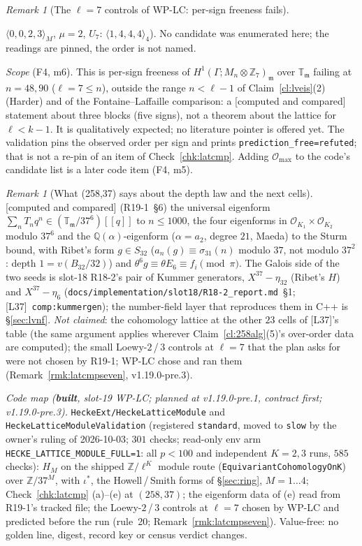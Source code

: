 \documentclass[11pt]{article}
\theoremstyle{remark}
\newtheorem{remark}[theorem]{Remark}
\newcommand{\Z}{\mathbb{Z}}
\newcommand{\Q}{\mathbb{Q}}
\newcommand{\Ga}{\Gamma}
\newcommand{\T}{\mathbb{T}}
\newcommand{\m}{\mathfrak{m}}
\newcommand{\Mn}{M_n}
\newcommand{\CMPD}{\textsf{[computed and compared]}}   %
\begin{document}
\begin{remark}[The $\ell=7$ controls of WP-LC: per-sign freeness fails]
\begin{enumerate}
  $\langle0,0,2,3\rangle_M$, $\mu=2$, $U_7$: $\langle1,4,4,4\rangle_4$). No candidate was enumerated here; the readings are pinned, the order is not named.
\end{enumerate}
\emph{Scope} (F4, m6). This is per-sign freeness of $H^{1}(\Ga;\Mn\otimes\Z_7)_\m$ over $\T_\m$ failing at $n=48,90$ ($\ell=7\le n$), outside the range $n<\ell-1$ of
Claim~\ref{cl:lveis}(2) (Harder) and of the Fontaine--Laffaille comparison: a \CMPD{} statement about three blocks (five signs), not a theorem about the lattice for
$\ell<k-1$. It is qualitatively expected; no literature pointer is offered yet. The validation pins the observed order per sign and prints
\texttt{prediction\_free=refuted}; that is not a re-pin of an item of Check~\ref{chk:latcmp}. Adding $\mathcal O_{\max}$ to the code's candidate list is a later code
item (F4, m5).
\end{remark}

\begin{remark}[What (258,37) says about the depth law and the next cells]\label{rmk:258next}
\CMPD{} (R19-1~\S6) the universal eigenform $\sum_nT_nq^{n}\in(\T_\m/37^{6})[[q]]$ to $n\le1000$, the four eigenforms in $\mathcal O_{K_1}\times\mathcal O_{K_2}$ modulo
$37^{6}$ and the $\Q(\alpha)$-eigenform ($\alpha=a_2$, degree $21$, Maeda) to the Sturm bound, with Ribet's form $g\in S_{32}$ ($a_n(g)\equiv\sigma_{31}(n)$ modulo $37$, not
modulo $37^{2}$: depth $1=v(B_{32}/32)$) and $\theta^{6}g\equiv\theta E_6\equiv f_i\pmod\pi$. The Galois side of the two seeds is slot-18 R18-2's pair of Kummer
generators, $X^{37}-\eta_{32}$ (Ribet's $H$) and $X^{37}-\eta_6$ (\texttt{docs/implementation/slot18/R18-2\_report.md}~\S1; [L37]~\texttt{comp:kummergen}); the
number-field layer that reproduces them in C++ is \S\ref{sec:lvnf}. \emph{Not claimed}: the cohomology lattice at the other $23$ cells of [L37]'s table
(the same argument applies wherever Claim~\ref{cl:258alg}(5)'s over-order data are computed); the small Loewy-$2$\,/\,$3$ controls at $\ell=7$ that the plan asks
for were not chosen by R19-1; WP-LC chose and ran them (Remark~\ref{rmk:latcmpseven}, v1.19.0-pre.3).
\end{remark}

\noindent\emph{Code map (\textbf{built}, slot-19 WP-LC; planned at v1.19.0-pre.1, contract first; v1.19.0-pre.3).} \texttt{HeckeExt/HeckeLatticeModule} and
\texttt{HeckeLatticeModuleValidation} (registered \texttt{standard}, moved to \texttt{slow} by the owner's ruling of 2026-10-03; $301$ checks; read-only env arm
\texttt{HECKE\_LATTICE\_MODULE\_FULL=1}: all $p<100$ and independent $K=2,3$ runs, $585$ checks): $H_M$ on the shipped $\Z/\ell^{K}$ module route
(\texttt{EquivariantCohomologyOnK}) over $\Z/37^{M}$, with $\iota^{\ast}$, the Howell\,/\,Smith forms of \S\ref{sec:ring}, $M=1\dots4$; Check~\ref{chk:latcmp} (a)--(e) at $(258,37)$; the
eigenform data of (e) read from R19-1's tracked file; the Loewy-$2$\,/\,$3$ controls at $\ell=7$ chosen by WP-LC and predicted before the run (rule~20; Remark~\ref{rmk:latcmpseven}). Value-free: no
golden line, digest, record key or census verdict changes.
\end{document}
